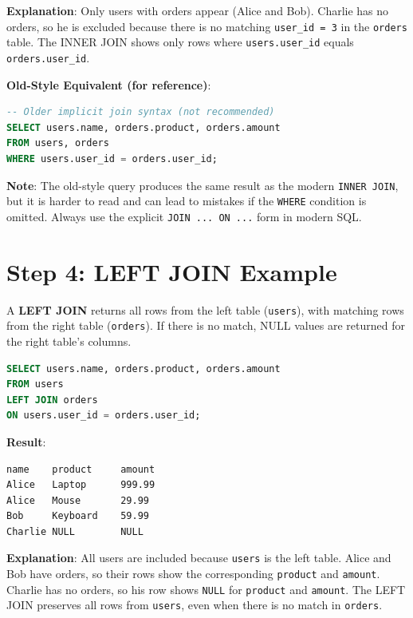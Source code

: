 \documentclass{article}
\begin{document}
\textbf{Explanation}: Only users with orders appear (Alice and Bob). Charlie has no orders, so he is excluded because there is no matching \texttt{user\_id = 3} in the \texttt{orders} table. The INNER JOIN shows only rows where \texttt{users.user\_id} equals \texttt{orders.user\_id}.

\bigskip
\noindent\textbf{Old-Style Equivalent (for reference)}:
\begin{lstlisting}[language=SQL]
-- Older implicit join syntax (not recommended)
SELECT users.name, orders.product, orders.amount
FROM users, orders
WHERE users.user_id = orders.user_id;
\end{lstlisting}

\textbf{Note}: The old-style query produces the same result as the modern \texttt{INNER JOIN}, but it is harder to read and can lead to mistakes if the \texttt{WHERE} condition is omitted. Always use the explicit \texttt{JOIN ... ON ...} form in modern SQL.

\section*{Step 4: LEFT JOIN Example}
A \textbf{LEFT JOIN} returns all rows from the left table (\texttt{users}), with matching rows from the right table (\texttt{orders}). If there is no match, NULL values are returned for the right table’s columns.

\begin{lstlisting}[language=SQL]
SELECT users.name, orders.product, orders.amount
FROM users
LEFT JOIN orders
ON users.user_id = orders.user_id;
\end{lstlisting}

\textbf{Result}:
\begin{verbatim}
name    product     amount
Alice   Laptop      999.99
Alice   Mouse       29.99
Bob     Keyboard    59.99
Charlie NULL        NULL
\end{verbatim}

\textbf{Explanation}: All users are included because \texttt{users} is the left table. Alice and Bob have orders, so their rows show the corresponding \texttt{product} and \texttt{amount}. Charlie has no orders, so his row shows \texttt{NULL} for \texttt{product} and \texttt{amount}. The LEFT JOIN preserves all rows from \texttt{users}, even when there is no match in \texttt{orders}.
\end{document}
